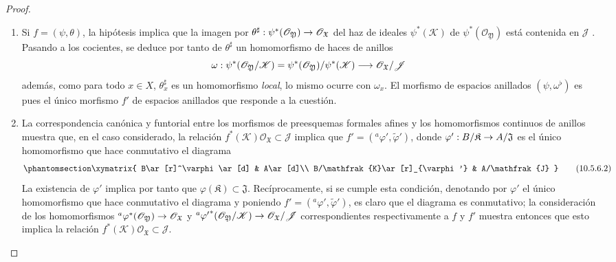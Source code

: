 \documentclass[oneside]{amsart}
\theoremstyle{ega-env-style}
\theoremstyle{ega-thm-env-style}
\theoremstyle{ega-defn-env-style}
\renewcommand{\to}{\mathchoice{\longrightarrow}{\rightarrow}{\rightarrow}{\rightarrow}}
\let\EGAOriginalLabel\label
\renewcommand{\label}[1]{\phantomsection\EGAOriginalLabel{#1}}
\begin{document}
\begin{proof}
\medskip\noindent
\begin{enumerate}
  \item[\rm{(i)}] Si $f=(\psi,\theta)$, la hipótesis implica que la imagen por $\theta^\sharp:\psi^*(\mathscr{O}_{\mathfrak{Y}})\to
    \mathscr{O}_{\mathfrak{X}}$ del haz de ideales $\psi^*(\mathscr{K})$ de $\psi^*(\mathscr{O}_{\mathfrak{Y}})$ está contenida en $\mathscr{J}$ .
    Pasando a los cocientes, se deduce por tanto de $\theta^\sharp$ un homomorfismo de haces de anillos
    \[
      \omega:\psi^*(\mathscr{O}_{\mathfrak{Y}}/\mathscr{K})
      =\psi^*(\mathscr{O}_{\mathfrak{Y}})/\psi^*(\mathscr{K})
      \to\mathscr{O}_{\mathfrak{X}}/\mathscr{J}
    \]
    además, como para todo $x\in X$, $\theta_x^\sharp$ es un homomorfismo \emph{local}, lo mismo ocurre con $\omega_x$.
    El morfismo de espacios anillados $(\psi,\omega^\flat)$ es pues  el único morfismo $f'$ de espacios anillados que responde a la cuestión.
  \item[\rm{(ii)}] La correspondencia canónica y funtorial entre los morfismos de preesquemas formales afines y los homomorfismos continuos de anillos  muestra que, en el caso considerado, la relación $f^*(\mathscr{K})\mathscr{O}_{\mathfrak{X}}\subset\mathscr{J}$ implica que $f'=({}^a\varphi',\widetilde{\varphi}')$, donde $\varphi':B/\mathfrak{K}\to A/\mathfrak{J}$ es el único homomorfismo que hace conmutativo el diagrama
    \[
      \label{I.10.5.6.2-fr}
      \xymatrix{
        B\ar[r]^\varphi\ar[d] & A\ar[d]\\
        B/\mathfrak{K}\ar[r]_{\varphi'} & A/\mathfrak{J}
      }
      \tag{10.5.6.2}
    \]
    La existencia de $\varphi'$ implica por tanto que $\varphi(\mathfrak{K})\subset\mathfrak{J}$.
    Recíprocamente, si se cumple esta condición, denotando por $\varphi'$ el único homomorfismo que hace conmutativo el diagrama  y poniendo $f'=({}^a\varphi',\widetilde{\varphi}')$, es claro que el diagrama  es conmutativo; la consideración de los homomorfismos ${}^a\varphi^*(\mathscr{O}_{\mathfrak{Y}})\to
    \mathscr{O}_{\mathfrak{X}}$ y ${}^a{\varphi'}^*(\mathscr{O}_{\mathfrak{Y}}/\mathscr{K})\to
    \mathscr{O}_{\mathfrak{X}}/\mathscr{J}$ correspondientes respectivamente a $f$ y $f'$ muestra entonces que esto implica la relación $f^*(\mathscr{K})\mathscr{O}_{\mathfrak{X}}\subset\mathscr{J}$.
\end{enumerate}
\end{proof}
\end{document}
